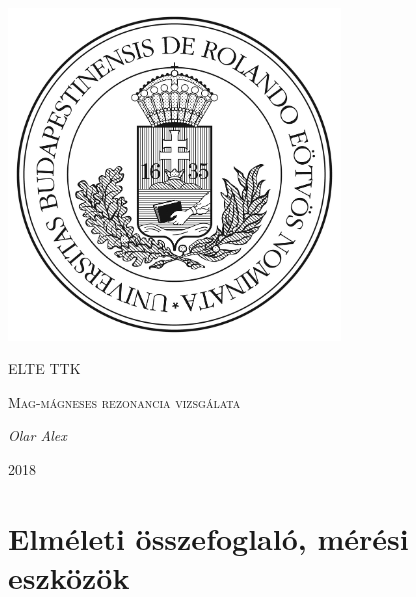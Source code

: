 \documentclass[a4paper,12pt]{article}
\begin{document}
\linespread{1.2}

\begin{titlepage}

	\centering
	\includegraphics[width=0.66\textwidth]{elte.jpg}\par\vspace{1cm}
	{\scshape\LARGE ELTE TTK \par}
	\vspace{3cm}
	{\scshape\Large Mag-mágneses rezonancia vizsgálata\par}
	\vspace{1cm}
	{\large\itshape Olar Alex\par}
	\vspace{3cm}
	{\large 2018 \par}
	
\end{titlepage}

\begin{abstract}

\par Mag-mágneses rezonancia során a mágneses térbe helyezett atomok rezonancia szerű elnyelést produkálnak. A labor célja ennek a jelenségnek a lehető legpontosabb kimérése volt az adott eszközökkel. 


\end{abstract}

\vfill

\tableofcontents

\newpage

\section{Elméleti összefoglaló, mérési eszközök}
\end{document}
